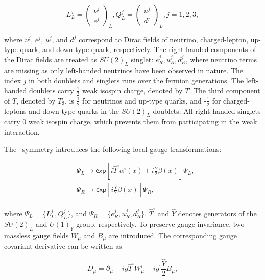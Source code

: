 \begin{equation}
L_{L}^{j}=\begin{pmatrix}\nu^{j}\\ e^{j}\end{pmatrix}_{L}, Q_{L}^{j}=\begin{pmatrix}u^j\\d^j\end{pmatrix}_{L}, j=1, 2, 3,
\end{equation}

where $\nu^{j}$, $e^{j}$, $u^{j}$, and $d^{j}$ correspond to Dirac fields of neutrino, charged-lepton, up-type quark, and down-type quark, respectively. The right-handed components of the Dirac fields are treated as $SU(2)_{L}$ singlet: $e_{R}^{j}, u_{R}^{j}, d_{R}^{j}$, where neutrino terms are missing as only left-handed neutrinos have been observed in nature. The index $j$ in both doublets and singlets runs over the fermion generations. The left-handed doublets carry $\frac{1}{2}$ weak isospin charge, denoted by $T$. The third component of $T$, denoted by $T_3$, is $\frac{1}{2}$ for neutrinos and up-type quarks, and -$\frac{1}{2}$ for charged-leptons and down-type quarks in the $SU(2)_{L}$ doublets. All right-handed singlets carry 0 weak isospin charge, which prevents them from participating in the weak interaction. 

The \ew~symmetry introduces the following local gauge transformations:

\begin{equation}
\begin{split}
&\Psi_{L}\rightarrow\textsf{exp}[i\hat{T}^{i}\alpha^{i}(x)+i\frac{\hat{Y}}{2}\beta(x)]\Psi_{L},\\
&\Psi_{R}\rightarrow\textsf{exp}[i\frac{\hat{Y}}{2}\beta(x)]\Psi_{R},
\end{split}
\end{equation}

where $\Psi_{L}=\{L_{L}^{j},Q_{L}^{j}\}$, and $\Psi_{R}=\{e_{R}^{j}, u_{R}^{j}, d_{R}^{j}\}$. $\hat{T}^{i}$ and $\hat{Y}$ denotes generators of the $SU(2)_{L}$ and $U(1)_{Y}$ group, respectively. To preserve gauge invariance, two massless gauge fields $W_{\mu}$ and $B_{\mu}$ are introduced. The corresponding gauge covariant derivative can be written as

\begin{equation}
\label{eq:EWCov}
D_{\mu}=\partial_{\mu}-ig\hat{T}^{i}W_{\mu}^{i}-ig^{\prime}\frac{\hat{Y}}{2}B_{\mu},
\end{equation}

